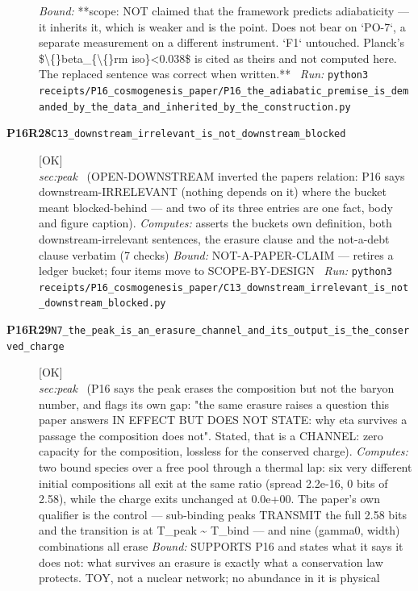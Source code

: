 \begin{description}
 \emph{Bound:} **scope: NOT claimed that the framework predicts adiabaticity --- it inherits it, which is weaker and is the point. Does not bear on `PO-7`, a separate measurement on a different instrument. `F1` untouched. Planck's \$\textbackslash\{\}beta\_\{\textbackslash\{\}rm iso\}<0.038\$ is cited as theirs and not computed here. The replaced sentence was correct when written.**
\ \emph{Run:} \texttt{python3 receipts/P16\_cosmogenesis\_paper/P16\_the\_adiabatic\_premise\_is\_demanded\_by\_the\_data\_and\_inherited\_by\_the\_construction.py}
\item[\rcptlabel{C13_downstream_irrelevant_is_not_downstream_blocked}{P16R28}\textbf{P16R28}\quad\texttt{C13\_downstream\_irrelevant\_is\_not\_downstream\_blocked}]\hfill\textsf{[OK]}\\
\textit{sec:peak} \ (OPEN-DOWNSTREAM inverted the papers relation: P16 says downstream-IRRELEVANT (nothing depends on it) where the bucket meant blocked-behind --- and two of its three entries are one fact, body and figure caption). 
\emph{Computes:} asserts the buckets own definition, both downstream-irrelevant sentences, the erasure clause and the not-a-debt clause verbatim (7 checks)
 \emph{Bound:} NOT-A-PAPER-CLAIM --- retires a ledger bucket; four items move to SCOPE-BY-DESIGN
\ \emph{Run:} \texttt{python3 receipts/P16\_cosmogenesis\_paper/C13\_downstream\_irrelevant\_is\_not\_downstream\_blocked.py}
\item[\rcptlabel{N7_the_peak_is_an_erasure_channel_and_its_output_is_the_conserved_charge}{P16R29}\textbf{P16R29}\quad\texttt{N7\_the\_peak\_is\_an\_erasure\_channel\_and\_its\_output\_is\_the\_conserved\_charge}]\hfill\textsf{[OK]}\\
\textit{sec:peak} \ (P16 says the peak erases the composition but not the baryon number, and flags its own gap: "the same erasure raises a question this paper answers IN EFFECT BUT DOES NOT STATE: why eta survives a passage the composition does not". Stated, that is a CHANNEL: zero capacity for the composition, lossless for the conserved charge). 
\emph{Computes:} two bound species over a free pool through a thermal lap: six very different initial compositions all exit at the same ratio (spread 2.2e-16, 0 bits of 2.58), while the charge exits unchanged at 0.0e+00. The paper's own qualifier is the control --- sub-binding peaks TRANSMIT the full 2.58 bits and the transition is at T\_peak \textasciitilde{} T\_bind --- and nine (gamma0, width) combinations all erase
 \emph{Bound:} SUPPORTS P16 and states what it says it does not: what survives an erasure is exactly what a conservation law protects. TOY, not a nuclear network; no abundance in it is physical

\end{description}
